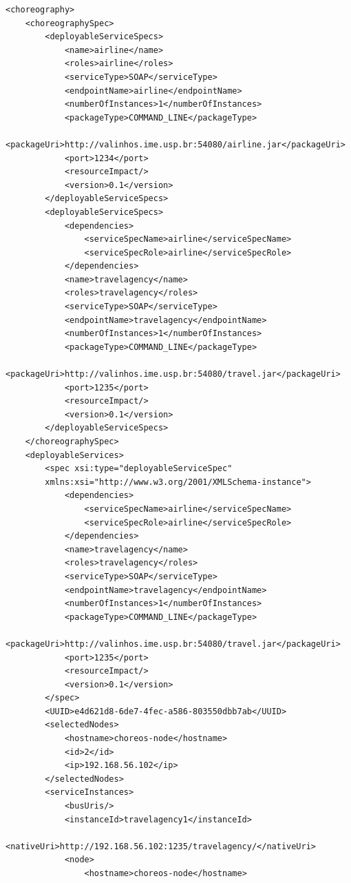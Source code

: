 \documentclass[a4paper, 10pt]{article}
\begin{document}
{\begin{lstlisting}[caption=Choreography XML representation example, label=lst:chor_xml]
<choreography>
    <choreographySpec>
        <deployableServiceSpecs>
            <name>airline</name>
            <roles>airline</roles>
            <serviceType>SOAP</serviceType>
            <endpointName>airline</endpointName>
            <numberOfInstances>1</numberOfInstances>
            <packageType>COMMAND_LINE</packageType>
            <packageUri>http://valinhos.ime.usp.br:54080/airline.jar</packageUri>
            <port>1234</port>
            <resourceImpact/>
            <version>0.1</version>
        </deployableServiceSpecs>
        <deployableServiceSpecs>
            <dependencies>
                <serviceSpecName>airline</serviceSpecName>
                <serviceSpecRole>airline</serviceSpecRole>
            </dependencies>
            <name>travelagency</name>
            <roles>travelagency</roles>
            <serviceType>SOAP</serviceType>
            <endpointName>travelagency</endpointName>
            <numberOfInstances>1</numberOfInstances>
            <packageType>COMMAND_LINE</packageType>
            <packageUri>http://valinhos.ime.usp.br:54080/travel.jar</packageUri>
            <port>1235</port>
            <resourceImpact/>
            <version>0.1</version>
        </deployableServiceSpecs>
    </choreographySpec>
    <deployableServices>
        <spec xsi:type="deployableServiceSpec" 
        xmlns:xsi="http://www.w3.org/2001/XMLSchema-instance">
            <dependencies>
                <serviceSpecName>airline</serviceSpecName>
                <serviceSpecRole>airline</serviceSpecRole>
            </dependencies>
            <name>travelagency</name>
            <roles>travelagency</roles>
            <serviceType>SOAP</serviceType>
            <endpointName>travelagency</endpointName>
            <numberOfInstances>1</numberOfInstances>
            <packageType>COMMAND_LINE</packageType>
            <packageUri>http://valinhos.ime.usp.br:54080/travel.jar</packageUri>
            <port>1235</port>
            <resourceImpact/>
            <version>0.1</version>
        </spec>
        <UUID>e4d621d8-6de7-4fec-a586-803550dbb7ab</UUID>
        <selectedNodes>
            <hostname>choreos-node</hostname>
            <id>2</id>
            <ip>192.168.56.102</ip>
        </selectedNodes>
        <serviceInstances>
            <busUris/>
            <instanceId>travelagency1</instanceId>
            <nativeUri>http://192.168.56.102:1235/travelagency/</nativeUri>
            <node>
                <hostname>choreos-node</hostname>

\end{lstlisting}}
\end{document}
